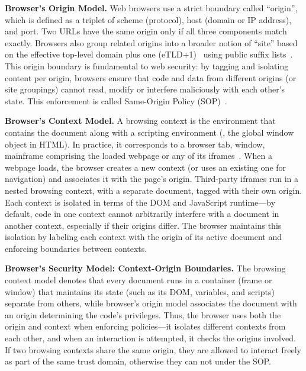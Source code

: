 \noindent \textbf{Browser's Origin Model.} 
%
Web browsers use a strict boundary called ``origin'', which is defined as a triplet of scheme (protocol), host (domain or IP address), and port. 
%
Two URLs have the same origin only if all three components match exactly. 
%
Browsers also group related origins into a broader notion of ``site'' based on the effective top-level domain plus one (eTLD+1)~\cite{WebKitTrackingPrevention} using public suffix lists~\cite{mozillafoundationPublicSuffixList2007}.
%
This origin boundary is fundamental to web security: by tagging and isolating content per origin, browsers ensure that code and data from different origins (or site groupings) cannot read, modify or interfere maliciously with each other's state.
%
This enforcement is called Same-Origin Policy (SOP)~\cite{mdnSameoriginPolicySecurity2024}.
%
%


\noindent \textbf{Browser’s Context Model.} 
%
A browsing context is the environment that contains the document along with a scripting environment (\eg{}, the global window object in HTML). 
%
In practice, it corresponds to a browser tab, window, mainframe comprising the loaded webpage or any of its iframes~\cite{MDNBrowsingContext}. 
%
When a webpage loads, the browser creates a new context (or uses an existing one for navigation) and associates it with the page’s origin. 
%
Third-party iframes run in a nested browsing context, with a separate document, tagged with their own origin.
%
Each context is isolated in terms of the DOM and JavaScript runtime---by default, code in one context cannot arbitrarily interfere with a document in another context, especially if their origins differ.
%
The browser maintains this isolation by labeling each context with the origin of its active document and enforcing boundaries between contexts. 



\noindent \textbf{Browser's Security Model: Context-Origin Boundaries.} 
%
The browsing context model denotes that every document runs in a container (frame or window) that maintains its state (such as its DOM, variables, and scripts) separate from others, while browser's origin model associates the document with an origin determining the code’s privileges.
%
Thus, the browser uses both the origin and context when enforcing policies---it isolates different contexts from each other, and when an interaction is attempted, it checks the origins involved. 
%
If two browsing contexts share the same origin, they are allowed to interact freely as part of the same trust domain, otherwise they can not under the SOP.
%




